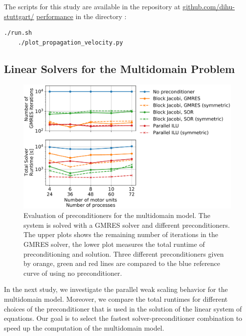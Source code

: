 \begin{reproduce_no_break}
  The scripts for this study are available in the repository at \href{https://github.com/dihu-stuttgart/performance}{github.com/dihu-stuttgart/} \href{https://github.com/dihu-stuttgart/performance}{performance} in the directory :
  \begin{lstlisting}[columns=fullflexible,breaklines=true,postbreak=\mbox{\textcolor{gray}{$\hookrightarrow$}\space}]
    ./run.sh
    ./plot_propagation_velocity.py
  \end{lstlisting}
\end{reproduce_no_break}

\subsection{Linear Solvers for the Multidomain Problem}\label{sec:multidomain_solvers}

\begin{figure}[H]
  \centering%
  \includegraphics[width=\textwidth]{images/results/studies/multidomain_solvers_selected.pdf}%
  \caption{Evaluation of preconditioners for the multidomain model. The system is solved with a GMRES solver and different preconditioners. The upper plots shows the remaining number of iterations in the GMRES solver, the lower plot measures the total runtime of preconditioning and solution. Three different preconditioners given by orange, green and red lines are compared to the blue reference curve of using no preconditioner.}%
  \label{fig:multidomain_solver}%
\end{figure}

In the next study, we investigate the parallel weak scaling behavior for the multidomain model. Moreover, we compare the total runtimes for different choices of the preconditioner that is used in the solution of the linear system of equations. Our goal is to select the fastest solver-preconditioner combination to speed up the computation of the multidomain model.

